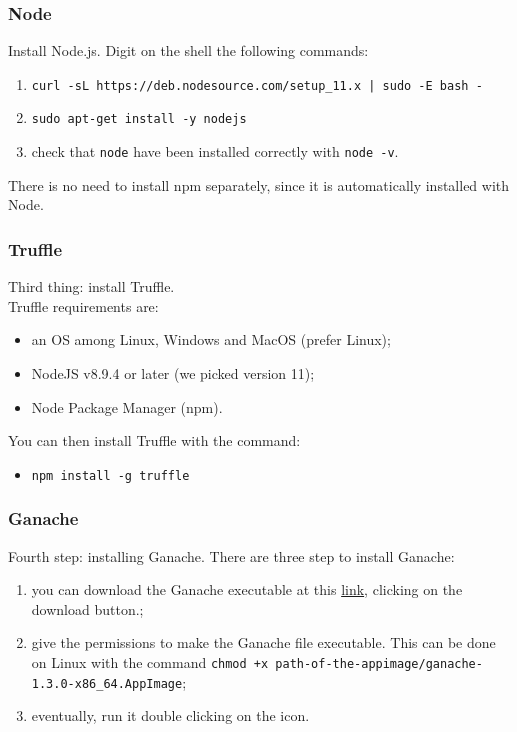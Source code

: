\subsubsection{Node}
Install Node.js. Digit on the shell the following commands:
\begin{enumerate}
	\item \texttt{curl -sL https://deb.nodesource.com/setup\_11.x | sudo -E bash -}
	\item \texttt{sudo apt-get install -y nodejs}
	\item check that \texttt{node} have been installed correctly with \texttt{node -v}.
\end{enumerate}
There is no need to install npm separately, since it is automatically installed with Node.

\subsubsection{Truffle}
Third thing: install Truffle.\\
Truffle requirements are:
\begin{itemize}
	\item an OS among Linux, Windows and MacOS (prefer Linux);
	\item NodeJS v8.9.4 or later (we picked version 11);
	\item Node Package Manager (npm).
\end{itemize}
You can then install Truffle with the command:
\begin{itemize}
	\item[] \texttt{npm install -g truffle}
\end{itemize}

\subsubsection{Ganache}
Fourth step: installing Ganache. There are three step to install Ganache:
\begin{enumerate}
	\item you can download the Ganache executable at this \href{https://truffleframework.com/ganache}{link}, clicking on the download button.;
	\item give the permissions to make the Ganache file executable. This can be done on Linux with the command \texttt{chmod +x path-of-the-appimage/ganache-1.3.0-x86\_64.AppImage};
	\item eventually, run it double clicking on the icon.
\end{enumerate}

